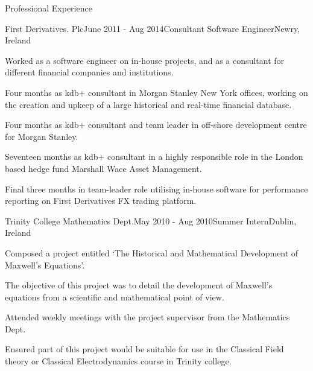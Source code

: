 \documentclass{resume} %
\begin{document}
\begin{rSection}{Professional Experience}
\begin{rSubsection}{First Derivatives. Plc}{June 2011 - Aug 2014}{Consultant Software Engineer}{Newry, Ireland}
\item Worked as a software engineer on in-house projects, and as a consultant for different financial companies and institutions.
\item Four months as kdb+ consultant in Morgan Stanley New York offices, working on the creation and upkeep of a large historical and real-time financial database.
\item Four months as kdb+ consultant and team leader in off-shore development centre for Morgan Stanley.
\item Seventeen months as kdb+ consultant in a highly responsible role in the London based hedge fund Marshall Wace Asset Management.
\item Final three months in team-leader role utilising in-house software for performance reporting on First Derivatives FX trading platform.
\end{rSubsection}


\begin{rSubsection}{Trinity College Mathematics Dept.}{May 2010 - Aug 2010}{Summer Intern}{Dublin, Ireland}
\item Composed a project entitled `The Historical and Mathematical Development of Maxwell's Equations'.
\item The objective of this project was to detail the development of Maxwell's equations from a scientific and mathematical point of view.
\item  Attended weekly meetings with the project supervisor from the Mathematics Dept.
\item Ensured part of this project would be suitable for use in the Classical Field theory or Classical Electrodynamics course in Trinity college.

\end{rSubsection}



\end{rSection}
\end{document}
